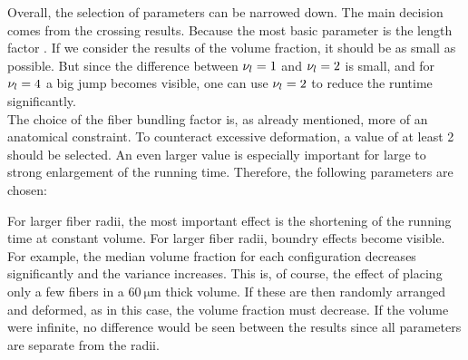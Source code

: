 Overall, the selection of parameters can be narrowed down.
The main decision comes from the crossing results.
Because the most basic parameter is the length factor \segLengthFactor{}.
If we consider the results of the volume fraction, it should be as small as possible.
But since the difference between $\textnormal{$\nu_{l}$}=\SI{1}{}$ and $\textnormal{$\nu_{l}$}=\SI{2}{}$ is small, and for $\textnormal{$\nu_{l}$}=\SI{4}{}$ a big jump becomes visible, one can use $\textnormal{$\nu_{l}$}=\SI{2}{}$ to reduce the runtime significantly.
\\
% 
The choice of the fiber bundling factor \segRadiusFactor{} is, as already mentioned, more of an anatomical constraint.
To counteract excessive deformation, a value of at least 2 should be selected.
An even larger value is especially important for large \segLengthFactor{} to strong enlargement of the running time.
Therefore, the following parameters are chosen:
% 
\begin{table}[H]
%
\centering
\end{table}
% 
For larger fiber radii, the most important effect is the shortening of the running time at constant volume.
For larger fiber radii, boundry effects become visible.
For example, the median volume fraction for each configuration decreases significantly and the variance increases.
This is, of course, the effect of placing only a few fibers in a $\SI{60}{\micro\meter}$ thick volume.
If these are then randomly arranged and deformed, as in this case, the volume fraction must decrease.
If the volume were infinite, no difference would be seen between the results since all parameters are separate from the radii.
